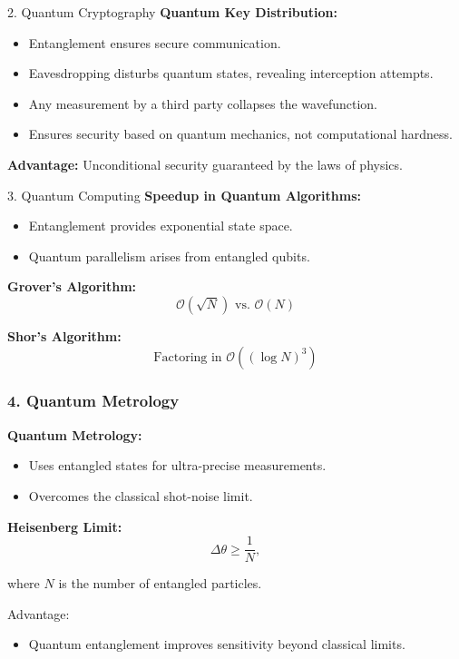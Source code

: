 \documentclass{beamer}
\begin{document}
\begin{frame}{2. Quantum Cryptography}
\textbf{Quantum Key Distribution:}
\begin{itemize}
    \item Entanglement ensures secure communication.
    \item Eavesdropping disturbs quantum states, revealing interception attempts.
\end{itemize}

\begin{itemize}
\item Any measurement by a third party collapses the wavefunction.  
\item Ensures security based on quantum mechanics, not computational hardness.
\end{itemize}
\textbf{Advantage:} Unconditional security guaranteed by the laws of physics.
\end{frame}

\begin{frame}{3. Quantum Computing}
\textbf{Speedup in Quantum Algorithms:}
\begin{itemize}
    \item Entanglement provides exponential state space.
    \item Quantum parallelism arises from entangled qubits.
\end{itemize}

\textbf{Grover's Algorithm:}
\[
\mathcal{O}(\sqrt{N}) \text{ vs. } \mathcal{O}(N)
\]

\textbf{Shor's Algorithm:}
\[
\text{Factoring in } \mathcal{O}((\log N)^3)
\]
\end{frame}

\begin{frame}
\frametitle{4. Quantum Metrology}

\textbf{Quantum Metrology:}
\begin{itemize}
    \item Uses entangled states for ultra-precise measurements.
    \item Overcomes the classical shot-noise limit.
\end{itemize}

\textbf{Heisenberg Limit:}
\[
\Delta \theta \ge \frac{1}{N},
\]

where \( N \) is the number of entangled particles.  

\begin{block}{Advantage:}
\begin{itemize}
\item Quantum entanglement improves sensitivity beyond classical limits.
\end{itemize}
\end{block}
\end{frame}
\end{document}
